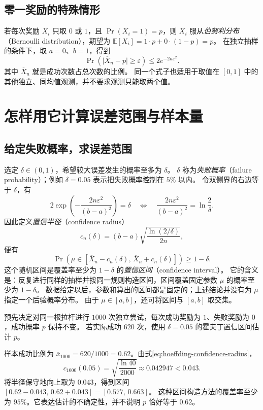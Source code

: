\documentclass[UTF8,12pt,a4paper,fontset=fandol]{ctexart}
\begin{document}
\subsection{零一奖励的特殊情形}

若每次奖励 $X_i$ 只取 $0$ 或 $1$，且 $\Pr(X_i=1)=p$，则
$X_i$ 服从\emph{伯努利分布}（Bernoulli distribution），期望为
$\mathbb E[X_i]=1\cdot p+0\cdot(1-p)=p$。
在独立抽样的条件下，取 $a=0$、$b=1$，得到
\begin{equation}
  \Pr\!\left(\lvert\overline X_n-p\rvert\geq\varepsilon\right)
  \leq 2e^{-2n\varepsilon^2}.
  \label{eq:hoeffding-bernoulli}
\end{equation}
其中 $\overline X_n$ 就是成功次数占总次数的比例。
同一个式子也适用于取值在 $[0,1]$ 中的其他独立、同均值观测，并不要求观测只能取两个值。

\section{怎样用它计算误差范围与样本量}
\label{sec:hoeffding-applications}

\subsection{给定失败概率，求误差范围}

选定 $\delta\in(0,1)$，希望较大误差发生的概率至多为 $\delta$。
$\delta$ 称为\emph{失败概率}（failure probability）；例如 $\delta=0.05$ 表示把失败概率控制在 $5\%$ 以内。
令双侧界的右边等于 $\delta$，有
\[
  2\exp\!\left(-\frac{2n\varepsilon^2}{(b-a)^2}\right)=\delta
  \quad\Longleftrightarrow\quad
  \frac{2n\varepsilon^2}{(b-a)^2}=\ln\frac{2}{\delta}.
\]
因此定义\emph{置信半径}（confidence radius）
\begin{equation}
  c_n(\delta)=(b-a)\sqrt{\frac{\ln(2/\delta)}{2n}},
  \label{eq:hoeffding-confidence-radius}
\end{equation}
便有
\begin{equation}
  \Pr\!\left(\mu\in
    [\overline X_n-c_n(\delta),\,\overline X_n+c_n(\delta)]\right)
  \geq1-\delta.
  \label{eq:hoeffding-confidence-interval}
\end{equation}
这个随机区间是覆盖率至少为 $1-\delta$ 的\emph{置信区间}（confidence interval）。
它的含义是：反复进行同样的抽样并按同一规则构造区间，区间覆盖固定参数 $\mu$ 的概率至少为 $1-\delta$。
数据给定以后，参数和算出的区间都是固定的；上述结论并没有为 $\mu$ 指定一个后验概率分布。
由于 $\mu\in[a,b]$，还可将区间与 $[a,b]$ 取交集。

\begin{example}[估计一根拉杆的成功概率]
预先决定对同一根拉杆进行 $1000$ 次独立尝试，每次成功奖励为 $1$、失败奖励为 $0$，成功概率 $p$ 保持不变。
若实际成功 $620$ 次，使用 $\delta=0.05$ 的霍夫丁置信区间估计 $p$。
\end{example}
\begin{solve}
样本成功比例为 $\overline x_{1000}=620/1000=0.62$。由式\eqref{eq:hoeffding-confidence-radius}，
\[
  c_{1000}(0.05)=\sqrt{\frac{\ln40}{2000}}
  \approx0.042947<0.043.
\]
将半径保守地向上取为 $0.043$，得到区间
$[0.62-0.043,\,0.62+0.043]=[0.577,\,0.663]$。
这种区间构造方法的覆盖率至少为 $95\%$。它表达估计的不确定性，并不说明 $p$ 恰好等于 $0.62$。
\end{solve}
\end{document}
